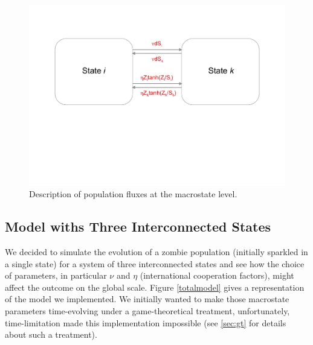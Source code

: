 \documentclass[11pt]{article} %
\begin{document}
\begin{figure}[h!]
\centerline{
\includegraphics[scale=0.45]{../images/Powerpoint_figures/macrostate.pdf}}
\caption{Description of population fluxes at the macrostate level.
\label{macrostate} }
\end{figure}



\subsection{Model withs Three Interconnected States}\indent

We decided to simulate the evolution of a zombie population (initially sparkled in a single state) for a system of three interconnected states and see how the choice of parameters, in particular $\nu$ and $\eta$ (international cooperation factors), might affect the outcome on the global scale. Figure \ref{totalmodel} gives a representation of the model we implemented. We initially wanted to make those macrostate parameters time-evolving under a game-theoretical treatment, unfortunately, time-limitation made this implementation impossible (see \ref{sec:gt} for details about such a treatment).
 
\end{document}
